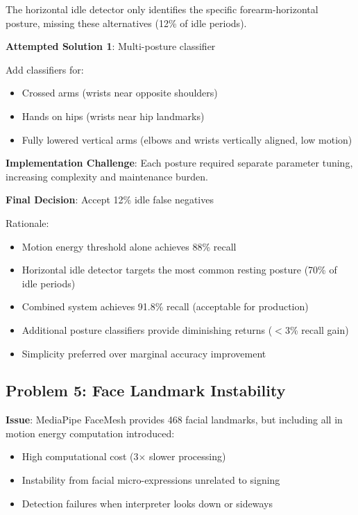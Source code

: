 \documentclass[11pt,a4paper]{article}
\begin{document}
The horizontal idle detector only identifies the specific forearm-horizontal posture, missing these alternatives (12\% of idle periods).

\textbf{Attempted Solution 1}: Multi-posture classifier

Add classifiers for:
\begin{itemize}
    \item Crossed arms (wrists near opposite shoulders)
    \item Hands on hips (wrists near hip landmarks)
    \item Fully lowered vertical arms (elbows and wrists vertically aligned, low motion)
\end{itemize}

\textbf{Implementation Challenge}: Each posture required separate parameter tuning, increasing complexity and maintenance burden.

\textbf{Final Decision}: Accept 12\% idle false negatives

Rationale:
\begin{itemize}
    \item Motion energy threshold alone achieves 88\% recall
    \item Horizontal idle detector targets the most common resting posture (70\% of idle periods)
    \item Combined system achieves 91.8\% recall (acceptable for production)
    \item Additional posture classifiers provide diminishing returns ($<$3\% recall gain)
    \item Simplicity preferred over marginal accuracy improvement
\end{itemize}

\subsection{Problem 5: Face Landmark Instability}

\textbf{Issue}: MediaPipe FaceMesh provides 468 facial landmarks, but including all in motion energy computation introduced:
\begin{itemize}
    \item High computational cost (3$\times$ slower processing)
    \item Instability from facial micro-expressions unrelated to signing
    \item Detection failures when interpreter looks down or sideways
\end{itemize}
\end{document}
